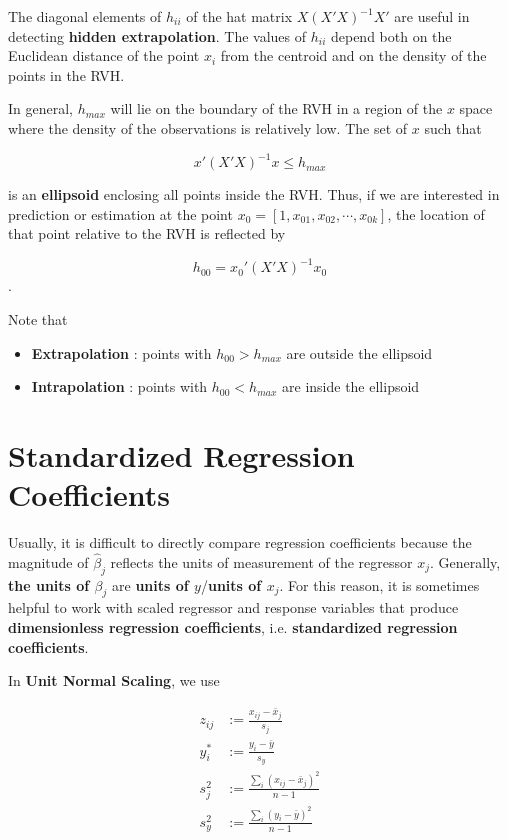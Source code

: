 \documentclass[12pt]{article}
\begin{document}
The diagonal elements of $h_{ii}$ of the hat matrix $X(X'X)^{-1}X'$ are useful in detecting \textbf{hidden extrapolation}. The values of $h_{ii}$ depend both on the Euclidean distance of the point $x_i$ from the centroid and on the density of the points in the RVH. 

In general, $h_{max}$ will lie on the boundary of the RVH in a region of the $x$ space where the density of the observations is relatively low. The set of $x$ such that 

$$x' (X'X)^{-1} x \le h_{max}$$

is an \textbf{ellipsoid} enclosing all points inside the RVH. Thus, if we are interested in prediction or estimation at the point $x_0 = [1, x_{01}, x_{02}, \cdots, x_{0k}]$, the location of that point relative to the RVH is reflected by

$$h_{00}= x_0' (X'X)^{-1} x_0 $$.

Note that 

\begin{itemize}
	\item \textbf{Extrapolation} : points with $h_{00} > h_{max}$ are outside the ellipsoid
	\item \textbf{Intrapolation} : points with $h_{00} < h_{max}$ are inside the ellipsoid
\end{itemize}

\pagebreak
\section{Standardized Regression Coefficients}

Usually, it is difficult to directly compare regression coefficients because the magnitude of $\hat{\beta}_j$ reflects the units of measurement of the regressor $x_j$. Generally, \textbf{the units of $\beta_j$} are \textbf{units of $y$}/\textbf{units of $x_j$}. For this reason, it is sometimes helpful to work with scaled regressor and response variables that produce \textbf{dimensionless regression coefficients}, i.e. \textbf{standardized regression coefficients}.


\bigskip
In \textbf{Unit Normal Scaling}, we use

$$
\begin{aligned}
z_{ij} &:= \frac{x_{ij} - \bar{x}_j }{s_j} \\
y_i^\ast &:= \frac{y_i - \bar{y} }{s_y} \\[10pt]
s_j^2 &:= \frac{ \sum_i (x_{ij} - \bar{x}_j)^2 }{ n-1 } \\
s_y^2 &:= \frac{ \sum_i (y_i - \bar{y})^2 }{ n-1 }
\end{aligned}
$$
\end{document}
